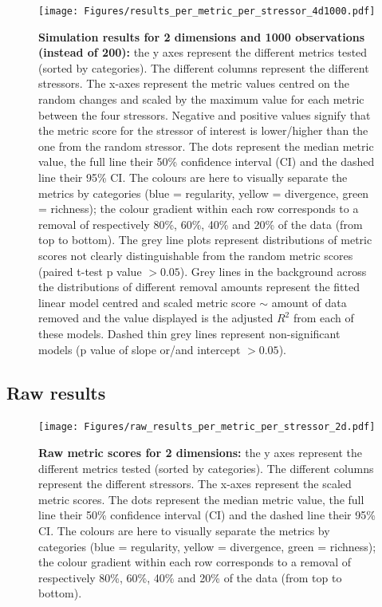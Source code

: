 \documentclass[12pt,letterpaper]{article}
\begin{document}
\begin{figure}[!htbp]
\centering
   \texttt{[image: Figures/results\_per\_metric\_per\_stressor\_4d1000.pdf]}
\caption{\scriptsize{\textbf{Simulation results for 2 dimensions and 1000 observations (instead of 200):} the y axes represent the different metrics tested (sorted by categories).
The different columns represent the different stressors. The x-axes represent the metric values centred on the random changes and scaled by the maximum value for each metric between the four stressors.
Negative and positive values signify that the metric score for the stressor of interest is lower/higher than the one from the random stressor.
The dots represent the median metric value, the full line their 50\% confidence interval (CI) and the dashed line their 95\% CI.
The colours are here to visually separate the metrics by categories (blue = regularity, yellow = divergence, green = richness); the colour gradient within each row corresponds to a removal of respectively 80\%, 60\%, 40\% and 20\% of the data (from top to bottom).
The grey line plots represent distributions of metric scores not clearly distinguishable from the random metric scores (paired t-test p value $> 0.05$).
Grey lines in the background across the distributions of different removal amounts represent the fitted linear model centred and scaled metric score $\sim$ amount of data removed and the value displayed is the adjusted $R^2$ from each of these models.
Dashed thin grey lines represent non-significant models (p value of slope or/and intercept $> 0.05$).
}}
\label{Fig:simulation_results_4d1000}
\end{figure}
\bigskip


\subsection{Raw results}

\begin{figure}[!htbp]
\centering
   \texttt{[image: Figures/raw\_results\_per\_metric\_per\_stressor\_2d.pdf]}
\caption{\scriptsize{\textbf{Raw metric scores for 2 dimensions:} the y axes represent the different metrics tested (sorted by categories).
The different columns represent the different stressors.
The x-axes represent the scaled metric scores.
The dots represent the median metric value, the full line their 50\% confidence interval (CI) and the dashed line their 95\% CI.
The colours are here to visually separate the metrics by categories (blue = regularity, yellow = divergence, green = richness); the colour gradient within each row corresponds to a removal of respectively 80\%, 60\%, 40\% and 20\% of the data (from top to bottom).
}}
\label{Fig:raw_results_2d}
\end{figure}
\bigskip
\end{document}
